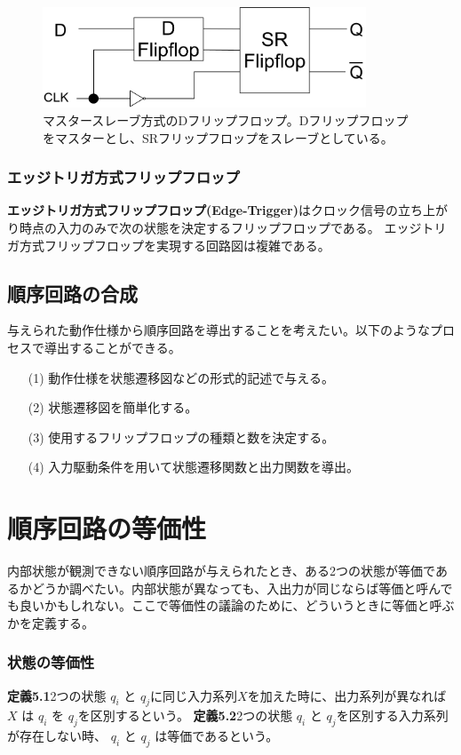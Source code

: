 \documentclass[a4j,10pt,oneside,openany,fleqn]{jsbook}
\begin{document}
\begin{figure}[h]
  \centering\includegraphics[height=3cm]{Images/DMasterSlave.png}
  \caption{マスタースレーブ方式のDフリップフロップ。Dフリップフロップをマスターとし、SRフリップフロップをスレーブとしている。}
\end{figure}

\subsubsection{エッジトリガ方式フリップフロップ}
\textbf{エッジトリガ方式フリップフロップ(Edge-Trigger)}はクロック信号の立ち上がり時点の入力のみで次の状態を決定するフリップフロップである。
エッジトリガ方式フリップフロップを実現する回路図は複雑である。

\subsection{順序回路の合成}
与えられた動作仕様から順序回路を導出することを考えたい。以下のようなプロセスで導出することができる。

\begin{enumerate}
\item[(1)]動作仕様を状態遷移図などの形式的記述で与える。
\item[(2)]状態遷移図を簡単化する。
\item[(3)]使用するフリップフロップの種類と数を決定する。
\item[(4)]入力駆動条件を用いて状態遷移関数と出力関数を導出。
  
\end{enumerate}

\section{順序回路の等価性}
内部状態が観測できない順序回路が与えられたとき、ある2つの状態が等価であるかどうか調べたい。内部状態が異なっても、入出力が同じならば等価と呼んでも良いかもしれない。ここで等価性の議論のために、どういうときに等価と呼ぶかを定義する。
\subsubsection{状態の等価性}
\textbf{定義5.1}2つの状態 $q_i$ と $q_j$に同じ入力系列$X$を加えた時に、出力系列が異なれば $X$ は $q_i$ を $q_j$を区別するという。
\textbf{定義5.2}2つの状態 $q_i$ と $q_j$を区別する入力系列が存在しない時、 $q_i$ と $q_j$ は等価であるという。
\end{document}
